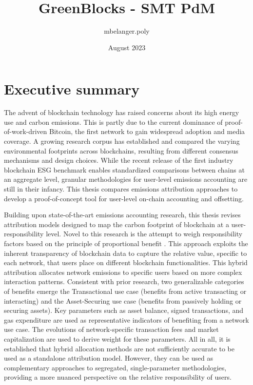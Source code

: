 \documentclass[11pt]{report}
\title{GreenBlocks - SMT PdM}
\author{mbelanger.poly}
\date{August 2023}
\begin{document}

\section*{Executive summary}


The advent of blockchain technology has raised concerns about its high energy use and carbon emissions. This is partly due to the current dominance of proof-of-work-driven Bitcoin, the first network to gain widespread adoption and media coverage. A growing research corpus has established and compared the varying environmental footprints across blockchains, resulting from different consensus mechanisms and design choices. While the recent release of the first industry blockchain ESG benchmark enables standardized comparisons between chains at an aggregate level, granular methodologies for user-level emissions accounting are still in their infancy. This thesis compares emissions attribution approaches to develop a proof-of-concept tool for user-level on-chain accounting and offsetting.

Building upon state-of-the-art emissions accounting research, this thesis revises attribution models designed to map the carbon footprint of blockchain at a user-responsibility level. Novel to this research is the attempt to weigh responsibility factors based on the principle of proportional benefit . This approach exploits the inherent transparency of blockchain data to capture the relative value, specific to each network, that users place on different blockchain functionalities. This hybrid attribution allocates network emissions to specific users based on more complex interaction patterns. Consistent with prior research, two generalizable categories of benefits emerge the Transactional use case (benefits from active transacting or interacting) and the Asset-Securing use case (benefits from passively holding or securing assets). Key parameters such as asset balance, signed transactions, and gas expenditure are used as representative indicators of benefiting from a network use case. The evolutions of network-specific transaction fees and market capitalization are used to derive weight for these parameters. All in all, it is established that hybrid allocation methods are not sufficiently accurate to be used as a standalone attribution model. However, they can be used as complementary approaches to segregated, single-parameter methodologies, providing a more nuanced perspective on the relative responsibility of users.
\end{document}

